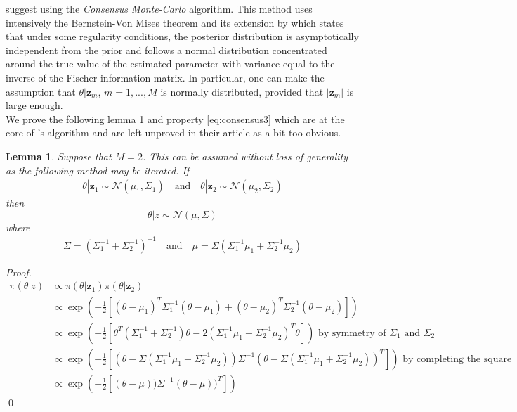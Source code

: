 \documentclass[11pt,a4paper]{report}\usepackage[]{graphicx}\usepackage[]{color}
\newtheorem{lemma}{Lemma}[section]
\begin{document}
\cite{scott2016bayes} suggest using the \textit{Consensus Monte-Carlo} algorithm. This method uses intensively the Bernstein-Von Mises theorem and its extension by \cite{le2012asymptotics} which states that under some regularity conditions, the posterior distribution is asymptotically independent from the prior and follows a normal distribution concentrated around the true value of the estimated parameter with variance equal to the inverse of the Fischer information matrix. In particular, one can make the assumption that $\theta|\textbf{z}_m$, $m=1,...,M$ is normally distributed, provided that $|\textbf{z}_m|$ is large enough.\\
We prove the following lemma \ref{lemma_consensus} and property \ref{eq:consensus3} which are at the core of \cite{scott2016bayes}'s algorithm and are left unproved in their article as a bit too obvious.
\begin{lemma}
\label{lemma_consensus}
Suppose that $M=2$. This can be assumed without loss of generality as the following method may be iterated. If
\begin{align*}
\theta|\textbf{z}_1\sim\mathcal{N}(\mu_1,\Sigma_1)\nonumber
\quad\text{and}\quad
\theta|\textbf{z}_2\sim\mathcal{N}(\mu_2,\Sigma_2)\nonumber
\end{align*}
then
\begin{equation}
\label{eq:consensus2}
\theta|z\sim\mathcal N(\mu,\Sigma)
\end{equation}
where
\begin{align*}
\Sigma=(\Sigma_1^{-1}+\Sigma_2^{-1})^{-1}\quad \text{and}\quad \mu=\Sigma(\Sigma_1^{-1}\mu_1+\Sigma_2^{-1}\mu_2)
\end{align*}
\end{lemma}
\textit{Proof.}\begin{align*}
\pi(\theta|z)&\propto\pi(\theta|\textbf{z}_1)\pi(\theta|\textbf{z}_2)\\
&\propto \exp\left(-\frac12\left[(\theta-\mu_1)^T\Sigma_1^{-1}(\theta-\mu_1)+(\theta-\mu_2)^T\Sigma_2^{-1}(\theta-\mu_2)\right]\right)\\
&\propto \exp\left(-\frac12\left[\theta^T(\Sigma_1^{-1}+\Sigma_2^{-1})\theta -2(\Sigma_1^{-1}\mu_1+\Sigma_2^{-1}\mu_2)^T\theta\right]\right)\text{ by symmetry of } \Sigma_1\text{ and } \Sigma_2\\
&\propto \exp\left(-\frac12\left[(\theta-\Sigma(\Sigma_1^{-1}\mu_1+\Sigma_2^{-1}\mu_2))\Sigma^{-1}(\theta-\Sigma(\Sigma_1^{-1}\mu_1+\Sigma_2^{-1}\mu_2))^T\right]\right)\text{ by completing the square}\\
&\propto \exp\left(-\frac12\left[(\theta-\mu))\Sigma^{-1}(\theta-\mu))^T\right]\right) 
\end{align*}\qed
\end{document}
